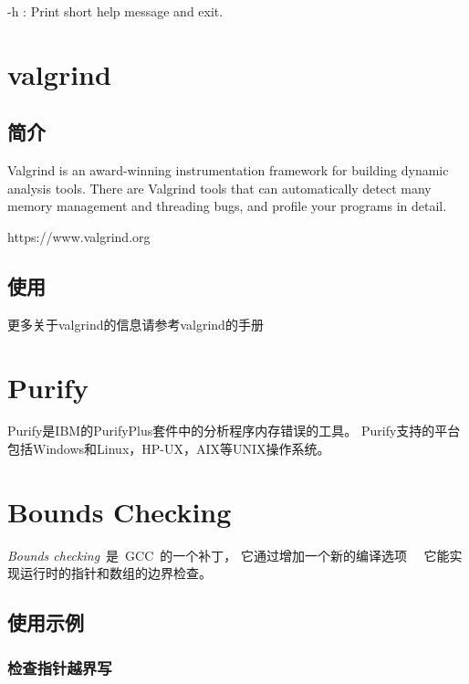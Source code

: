   -h : Print short help message and exit.


\section{valgrind}
\label{valgrind} 
\subsection{简介}
Valgrind is an award-winning instrumentation framework for building dynamic analysis tools. There are Valgrind tools that can automatically detect many memory management and threading bugs, and profile your programs in detail.

https://www.valgrind.org

\subsection{使用}

更多关于valgrind的信息请参考valgrind的手册\cite{valgrind-man}

\section{Purify}
\label{Purify} 
Purify是IBM的PurifyPlus套件中的分析程序内存错误的工具。
Purify支持的平台包括Windows和Linux，HP-UX，AIX等UNIX操作系统。


\section{Bounds Checking}
\emph{Bounds checking}~是~GCC~的一个补丁，
它通过增加一个新的编译选项~~
它能实现运行时的指针和数组的边界检查。

\subsection{使用示例}

\subsubsection{检查指针越界写}

